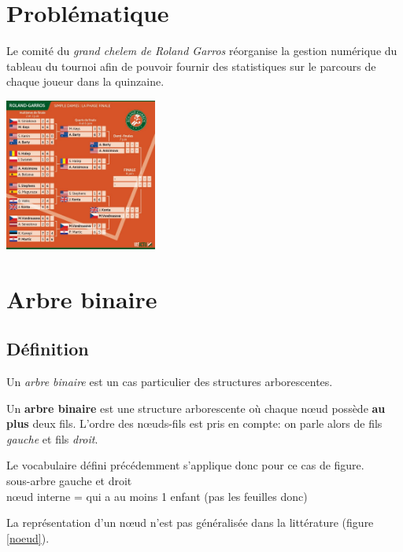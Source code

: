 \documentclass[a4paper,11pt]{article}
\begin{document}
\begin{Form}
\section{Problématique}
Le comité du \emph{grand chelem de Roland Garros} réorganise la gestion numérique du tableau du tournoi afin de pouvoir fournir des statistiques sur le parcours de chaque joueur dans la quinzaine.
\begin{center}
\centering
\includegraphics[width=5cm]{ressources/rg.jpg}
\label{rg}
\end{center}

\begin{center}
\end{center}
\section{Arbre binaire}
\subsection{Définition}
Un \emph{arbre binaire} est un cas particulier des structures arborescentes.
\begin{aretenir}[]
Un \textbf{arbre binaire} est une structure arborescente où chaque nœud possède \textbf{au plus} deux fils. L'ordre des nœuds-fils est pris en compte: on parle alors de fils \emph{gauche} et fils \emph{droit}.
\end{aretenir}
\begin{commentprof}
Le vocabulaire défini précédemment s'applique donc pour ce cas de figure.\\
sous-arbre gauche et droit\\
nœud interne = qui a au moins 1 enfant (pas les feuilles donc)
\end{commentprof}
La représentation d'un nœud n'est pas généralisée dans la littérature (figure \ref{noeud}).
\begin{center}
\end{center}
\end{Form}
\end{document}

